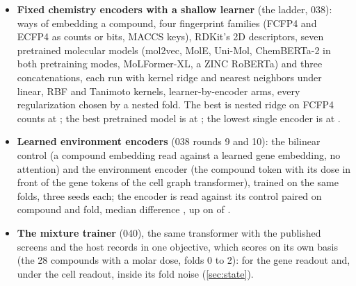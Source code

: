 \begin{itemize}
\item \textbf{Fixed chemistry encoders with a shallow learner} (the ladder, 038):
  \hydencoderN{} ways of embedding a compound, four fingerprint families (FCFP4 and
  ECFP4 as counts or bits, MACCS keys), RDKit's 2D descriptors, seven pretrained
  molecular models (mol2vec, MolE, Uni-Mol, ChemBERTa-2 in both pretraining modes,
  MoLFormer-XL, a ZINC RoBERTa) and three concatenations, each run with kernel ridge
  and nearest neighbors under linear, RBF and Tanimoto kernels, \hydencoderLearnerRuns{}
  learner-by-encoder arms, every regularization chosen by a nested fold. The best is
  nested ridge on FCFP4 counts at \hydencoderBest{}; the best pretrained model is
  \hydencoderBestPretrainedName{} at \hydencoderBestPretrained{}; the lowest single
  encoder is \hydencoderWorstName{} at \hydencoderWorst{}.
\item \textbf{Learned environment encoders} (038 rounds 9 and 10): the bilinear control
  (a compound embedding read against a learned gene embedding, no attention) and the
  environment encoder (the compound token with its dose in front of the gene tokens of
  the cell graph transformer), trained on the same folds, three seeds each; the
  encoder is read against its control paired on compound and fold, median difference
  \hydpairedMedian{}, up on \hydpairedUp{} of \hydpairedEvaluations{}.
\item \textbf{The mixture trainer} (040), the same transformer with the published screens
  and the host records in one objective, which scores on its own basis (the 28
  compounds with a molar dose, folds 0 to 2): \hydmixVanEnsemble{} for the gene readout
  and, under the cell readout, inside its fold noise (\cref{sec:state}).
\end{itemize}


